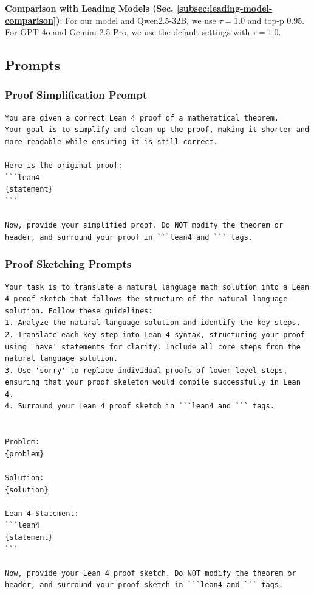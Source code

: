\textbf{Comparison with Leading Models (Sec. \ref{subsec:leading-model-comparison})}: For our model and Qwen2.5-32B, we use $\tau=1.0$ and top-p 0.95. For GPT-4o and Gemini-2.5-Pro, we use the default settings with $\tau=1.0$. 

\newpage
\subsection{Prompts} \label{sec:appendix-prompts}

\subsubsection{Proof Simplification Prompt} 
\begin{lstlisting}[caption={Zero-shot Proof Sketching Prompt},label={prompt-proof-simp}, captionpos=t, breaklines=true, style=mystyle]
You are given a correct Lean 4 proof of a mathematical theorem.
Your goal is to simplify and clean up the proof, making it shorter and more readable while ensuring it is still correct.

Here is the original proof:
```lean4
{statement}
```

Now, provide your simplified proof. Do NOT modify the theorem or header, and surround your proof in ```lean4 and ``` tags.
\end{lstlisting}

\subsubsection{Proof Sketching Prompts}

\begin{lstlisting}[caption={Zero-shot Proof Sketching Prompt},label={prompt-sketch-zeroshot}, captionpos=t, breaklines=true, style=mystyle]
Your task is to translate a natural language math solution into a Lean 4 proof sketch that follows the structure of the natural language solution. Follow these guidelines:
1. Analyze the natural language solution and identify the key steps.
2. Translate each key step into Lean 4 syntax, structuring your proof using 'have' statements for clarity. Include all core steps from the natural language solution.
3. Use 'sorry' to replace individual proofs of lower-level steps, ensuring that your proof skeleton would compile successfully in Lean 4.
4. Surround your Lean 4 proof sketch in ```lean4 and ``` tags.


Problem:
{problem}

Solution:
{solution}

Lean 4 Statement:
```lean4
{statement}
```

Now, provide your Lean 4 proof sketch. Do NOT modify the theorem or header, and surround your proof sketch in ```lean4 and ``` tags.
\end{lstlisting}

